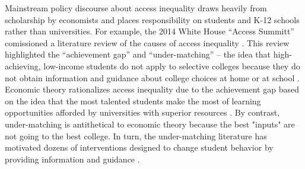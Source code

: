\documentclass[twoside]{article}
\begin{document}
Mainstream policy discourse about access inequality draws heavily from scholarship by economists and places responsibility on students and K-12 schools rather than universities. For example, the 2014 White House ``Access Summitt'' comissioned a literature review of the causes of access inequality \citep{RN4016}.  This review highlighted the ``achievement gap'' and ``under-matching'' -- the idea that high-achieving, low-income students do not apply to selective colleges because they do not obtain information and guidance about college choices at home or at school \citep{RN3699,RN3700}.  Economic theory rationalizes access inequality due to the achievement gap based on the idea that the most talented students make the most of learning opportunities afforded by universities with superior resources \citep{RN1549,RN2247,RN2402,RN1545}. By contrast, under-matching is antithetical to economic theory because the best "inputs" are not going to the best college. In turn, the under-matching literature has motivated dozens of interventions designed to change student behavior by providing information and guidance \citep[e.g., ][]{RN4352,RN4345,RN4351}.
\end{document}
